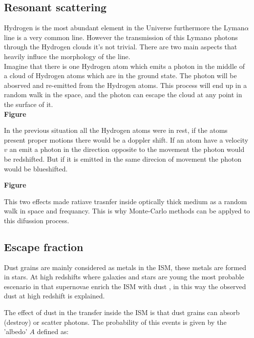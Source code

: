 \subsection{Resonant scattering}\label{sec:resonant}

Hydrogen is the most abundant element in the Universe furthermore
the Lyman$\alpha$ line is a very common line. However the transmission of this
Lyman$\alpha$ photons through the Hydrogen clouds it's not trivial. There 
are two main aspects that heavily influce the morphology of the line.\\

Imagine that  there is one Hydrogen atom which emits 
a \ly photon in the middle of a cloud of Hydrogen atoms which are in the
ground state. The \ly photon will be abosrved and re-emitted from 
the Hydrogen atoms. This process will end up in a random walk in the space,
and the photon can escape the cloud at any point in the surface of it.\\

{\bf{Figure}}

In the previous situation all the Hydrogen atoms were in rest, if the atoms
present proper motions there would be a doppler shift. If an atom have a velocity 
$v$ an emit a \ly photon in the direction opposite to the movement the \ly photon 
would be redshifted. But if it is emitted in the same direcion of movement the
\ly photon would be blueshifted.    

{\bf{Figure}}

This two effects made ratiave trasnfer inside optically thick medium as a random 
walk in space and frequancy. This is why Monte-Carlo methods can be
applyed to this difussion process.
 
\subsection{Escape fraction}

Dust grains are mainly considered as metals in the ISM, these
metals are formed in stars. At high redshifts where galaxies and 
stars are young the most probable escenario in that supernovae 
enrich the ISM with dust \citep{Kotak09}, in this way the observed 
dust \citep{Coppin09}  at high redshift is explained. 

The effect of dust in the \ly transfer inside the ISM is that 
dust grains can absorb (destroy) or scatter \ly photons. The 
probability of this events is given by the 'albedo' $A$ defined as:

